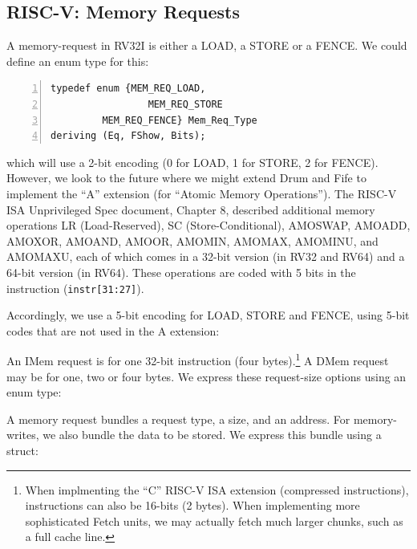 
\subsection{RISC-V: Memory Requests}

\label{Sec_Mem_Req}


A memory-request in RV32I is either a LOAD, a STORE or a FENCE.  We
could define an enum type for this:

{\small
\begin{Verbatim}[frame=single, numbers=left]
   typedef enum {MEM_REQ_LOAD,
                 MEM_REQ_STORE
		 MEM_REQ_FENCE} Mem_Req_Type
deriving (Eq, FShow, Bits);
\end{Verbatim}
}

which will use a 2-bit encoding (0 for LOAD, 1 for STORE, 2 for
FENCE).  However, we look to the future where we might extend Drum and
Fife to implement the ``A'' extension (for ``Atomic Memory
Operations'').  The RISC-V ISA Unprivileged Spec document, Chapter 8,
described additional memory operations LR (Load-Reserved), SC
(Store-Conditional), AMOSWAP, AMOADD, AMOXOR, AMOAND, AMOOR, AMOMIN,
AMOMAX, AMOMINU, and AMOMAXU, each of which comes in a 32-bit version
(in RV32 and RV64) and a 64-bit version (in RV64).  These operations
are coded with 5 bits in the instruction (\verb|instr[31:27]|).

Accordingly, we use a 5-bit encoding for LOAD, STORE and FENCE, using
5-bit codes that are not used in the A extension:



An IMem request is for one 32-bit instruction (four
bytes).\footnote{When implmenting the ``C'' RISC-V ISA extension
(compressed instructions), instructions can also be 16-bits (2 bytes).
When implementing more sophisticated Fetch units, we may actually
fetch much larger chunks, such as a full cache line.}  A DMem request
may be for one, two or four bytes.  We express these request-size
options using an enum type:



A memory request bundles a request type, a size, and an address.  For
memory-writes, we also bundle the data to be stored.  We express this
bundle using a struct:



